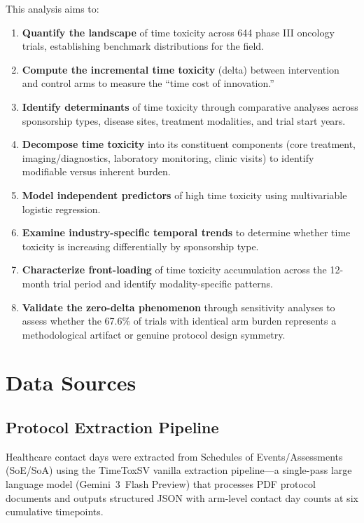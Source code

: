 \documentclass[11pt,a4paper]{article}
\begin{document}
This analysis aims to:
\begin{enumerate}[label=(\alph*)]
    \item \textbf{Quantify the landscape} of time toxicity across 644 phase III oncology trials, establishing benchmark distributions for the field.
    \item \textbf{Compute the incremental time toxicity} (delta) between intervention and control arms to measure the ``time cost of innovation.''
    \item \textbf{Identify determinants} of time toxicity through comparative analyses across sponsorship types, disease sites, treatment modalities, and trial start years.
    \item \textbf{Decompose time toxicity} into its constituent components (core treatment, imaging/diagnostics, laboratory monitoring, clinic visits) to identify modifiable versus inherent burden.
    \item \textbf{Model independent predictors} of high time toxicity using multivariable logistic regression.
    \item \textbf{Examine industry-specific temporal trends} to determine whether time toxicity is increasing differentially by sponsorship type.
    \item \textbf{Characterize front-loading} of time toxicity accumulation across the 12-month trial period and identify modality-specific patterns.
    \item \textbf{Validate the zero-delta phenomenon} through sensitivity analyses to assess whether the 67.6\% of trials with identical arm burden represents a methodological artifact or genuine protocol design symmetry.
\end{enumerate}

\section{Data Sources}

\subsection{Protocol Extraction Pipeline}

Healthcare contact days were extracted from Schedules of Events/Assessments (SoE/SoA) using the TimeToxSV vanilla extraction pipeline---a single-pass large language model (Gemini~3~Flash Preview) that processes PDF protocol documents and outputs structured JSON with arm-level contact day counts at six cumulative timepoints.
\end{document}
